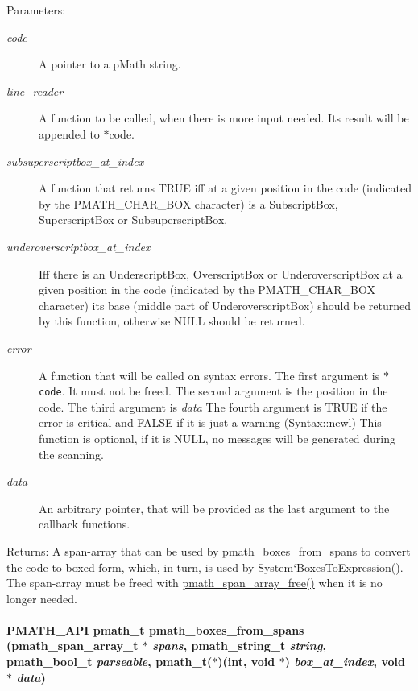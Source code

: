 \begin{Desc}
\item[Parameters:]
\begin{description}
\item[{\em code}]A pointer to a pMath string. \item[{\em line\_\-reader}]A function to be called, when there is more input needed. Its result will be appended to $\ast$code. \item[{\em subsuperscriptbox\_\-at\_\-index}]A function that returns TRUE iff at a given position in the code (indicated by the PMATH\_\-CHAR\_\-BOX character) is a SubscriptBox, SuperscriptBox or SubsuperscriptBox. \item[{\em underoverscriptbox\_\-at\_\-index}]Iff there is an UnderscriptBox, OverscriptBox or UnderoverscriptBox at a given position in the code (indicated by the PMATH\_\-CHAR\_\-BOX character) its base (middle part of UnderoverscriptBox) should be returned by this function, otherwise NULL should be returned. \item[{\em error}]A function that will be called on syntax errors. The first argument is {\tt $\ast$code}. It must not be freed. The second argument is the position in the code. The third argument is {\em data\/} The fourth argument is TRUE if the error is critical and FALSE if it is just a warning (Syntax::newl) This function is optional, if it is NULL, no messages will be generated during the scanning. \item[{\em data}]An arbitrary pointer, that will be provided as the last argument to the callback functions. \end{description}
\end{Desc}
\begin{Desc}
\item[Returns:]A span-array that can be used by pmath\_\-boxes\_\-from\_\-spans to convert the code to boxed form, which, in turn, is used by System`BoxesToExpression(). The span-array must be freed with \hyperlink{group__parser_gceb05ef4c39c239d68f39e3b9bde5f1e}{pmath\_\-span\_\-array\_\-free()} when it is no longer needed. \end{Desc}
\hypertarget{group__parser_g2c9c96d98401746a9f19d7dc52255e0f}{
\paragraph[{pmath\_\-boxes\_\-from\_\-spans}]{\setlength{\rightskip}{0pt plus 5cm}PMATH\_\-API {\bf pmath\_\-t} pmath\_\-boxes\_\-from\_\-spans ({\bf pmath\_\-span\_\-array\_\-t} $\ast$ {\em spans}, \/  {\bf pmath\_\-string\_\-t} {\em string}, \/  {\bf pmath\_\-bool\_\-t} {\em parseable}, \/  {\bf pmath\_\-t}($\ast$)(int, void $\ast$) {\em box\_\-at\_\-index}, \/  void $\ast$ {\em data})}\hfill}
\label{group__parser_g2c9c96d98401746a9f19d7dc52255e0f}


